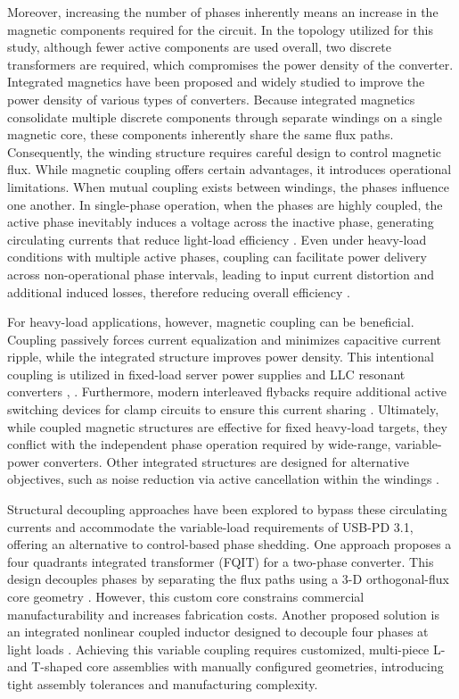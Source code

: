 \documentclass[lettersize,journal]{IEEEtran}
\begin{document}
Moreover, increasing the number of phases inherently means an increase in the magnetic components required for the circuit. In the topology utilized for this study, although fewer active components are used overall, two discrete transformers are required, which compromises the power density of the converter. Integrated magnetics have been proposed and widely studied to improve the power density of various types of converters. Because integrated magnetics consolidate multiple discrete components through separate windings on a single magnetic core, these components inherently share the same flux paths. Consequently, the winding structure requires careful design to control magnetic flux. While magnetic coupling offers certain advantages, it introduces operational limitations. When mutual coupling exists between windings, the phases influence one another. In single-phase operation, when the phases are highly coupled, the active phase inevitably induces a voltage across the inactive phase, generating circulating currents that reduce light-load efficiency \cite{Yang_2020, Z_Li_2025}. Even under heavy-load conditions with multiple active phases, coupling can facilitate power delivery across non-operational phase intervals, leading to input current distortion and additional induced losses, therefore reducing overall efficiency \cite{Yang_2020}.

For heavy-load applications, however, magnetic coupling can be beneficial. Coupling passively forces current equalization and minimizes capacitive current ripple, while the integrated structure improves power density. This intentional coupling is utilized in fixed-load server power supplies and LLC resonant converters \cite{Ahmad}, \cite{Dou, Nakakohara}. Furthermore, modern interleaved flybacks require additional active switching devices for clamp circuits to ensure this current sharing \cite{Z_Chen_s42835}. Ultimately, while coupled magnetic structures are effective for fixed heavy-load targets, they conflict with the independent phase operation required by wide-range, variable-power converters. Other integrated structures are designed for alternative objectives, such as noise reduction via active cancellation within the windings \cite{Jin_2024}.

Structural decoupling approaches have been explored to bypass these circulating currents and accommodate the variable-load requirements of USB-PD 3.1, offering an alternative to control-based phase shedding. One approach proposes a four quadrants integrated transformer (FQIT) for a two-phase converter. This design decouples phases by separating the flux paths using a 3-D orthogonal-flux core geometry \cite{Ouyang}. However, this custom core constrains commercial manufacturability and increases fabrication costs. Another proposed solution is an integrated nonlinear coupled inductor designed to decouple four phases at light loads \cite{Z_Li_2025}. Achieving this variable coupling requires customized, multi-piece L- and T-shaped core assemblies with manually configured geometries, introducing tight assembly tolerances and manufacturing complexity.
\end{document}
